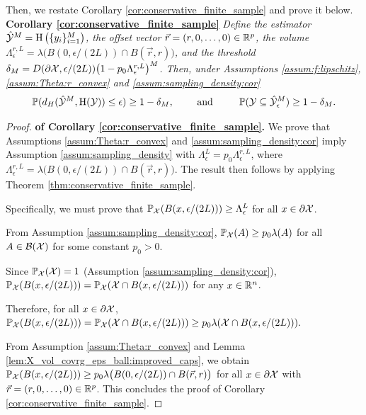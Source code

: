 \documentclass[12pt]{l4dc2022} %
\begin{document}
Then, we restate Corollary  \ref{cor:conservative_finite_sample} and prove it below. 
\\[2mm]
\textbf{Corollary \ref{cor:conservative_finite_sample}} 
\textit{Define the estimator $\hat{\mathcal{Y}}^M=\textrm{H}\left(\{y_i\}_{i{=}1}^M\right)$, 
 the offset vector 
 $\vec{r}=(r,0,\dots,0)\in\mathbb{R}^p$, 
 the volume $\Lambda_{\epsilon}^{r,L}=\lambda\big(
 B(0,\epsilon/(2L)) 
 \cap B(\vec{r},r)
 \big)$, 
 and the threshold
 $
 \delta_M= 
 D(\partial\mathcal{X},\epsilon/(2L))\big(1 -
 	p_0 \Lambda_{\epsilon}^{r,L}
 \big)^M
 $.
% 
Then, under Assumptions \ref{assum:f:lipschitz},  \ref{assum:Theta:r_convex} and \ref{assum:sampling_density:cor} 
$$
\Prob(
d_H(
\hat\Y^M, 
\hull(\Y)
)\leq \epsilon
)\geq 1-\delta_M,
\qquad \text{ and }\qquad\ 
\Prob(\Y\subseteq\hat\Y_\epsilon^M)\geq 1-\delta_M.
$$
% 
}
% 
\begin{proof}\textbf{of Corollary \ref{cor:conservative_finite_sample}.}
We prove that Assumptions \ref{assum:Theta:r_convex} and \ref{assum:sampling_density:cor} imply Assumption \ref{assum:sampling_density} with $\Lambda_{\epsilon}^{L}=p_0\Lambda_{\epsilon}^{r,L}$, where $\Lambda_{\epsilon}^{r,L}=\lambda\big(
 B(0,\epsilon/(2L)) 
 \cap B(\vec{r},r)
 \big)$. 
The result then follows by applying Theorem \ref{thm:conservative_finite_sample}.


Specifically, we must prove that 
$\mathbb{P}_{\mathcal{X}}(B(x,\epsilon/(2L)))\geq \Lambda_{\epsilon}^{L}$ for all  
	$x\in\partial\mathcal{X}$. 
	
	From Assumption \ref{assum:sampling_density:cor}, 
	$\mathbb{P}_{\mathcal{X}}(A)\geq p_0\lambda(A)$ for all  
 	$A\in\mathcal{B}(\mathcal{X})$ for some constant $p_0>0$.

Since $\mathbb{P}_{\mathcal{X}}(\mathcal{X})=1$ (Assumption \ref{assum:sampling_density:cor}), 
	$\mathbb{P}_{\mathcal{X}}(B(x,\epsilon/(2L)))
	=
	\mathbb{P}_{\mathcal{X}}(\mathcal{X}\cap B(x,\epsilon/(2L)))
	$ for any  
	$x\in\mathbb{R}^n$.
	
	
	Therefore, for all  
	$x\in\partial\mathcal{X}$, 
	$\mathbb{P}_{\mathcal{X}}(B(x,\epsilon/(2L)))
	=
	\mathbb{P}_{\mathcal{X}}(\mathcal{X}\cap B(x,\epsilon/(2L)))
	\geq 
	p_0 \lambda(\mathcal{X}\cap B(x,\epsilon/(2L))).$
	
	From Assumption \ref{assum:Theta:r_convex} and Lemma \ref{lem:X_vol_covrg_eps_ball:improved_caps}, we obtain  
	$\mathbb{P}_{\mathcal{X}}(B(x,\epsilon/(2L)))
	\geq 
	p_0 \lambda\big(
B(0,\epsilon/(2L)) 
\cap B(\vec{r},r)
\big)$  for all  
	$x\in\partial\mathcal{X}$ with $\vec{r}=(r,0,\dots,0)\in\mathbb{R}^p$. 
	This concludes the proof of Corollary \ref{cor:conservative_finite_sample}.
\end{proof}
\end{document}
